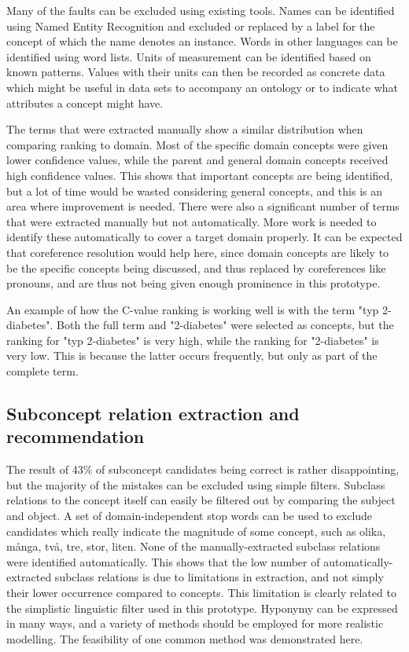 \documentclass[a4paper]{report}
\begin{document}
Many of the faults can be excluded using existing tools.
Names can be identified using Named Entity Recognition and excluded or replaced by a label for the concept of which the name denotes an instance.
Words in other languages can be identified using word lists.
Units of measurement can be identified based on known patterns.
Values with their units can then be recorded as concrete data which might be useful in data sets to accompany an ontology or to indicate what attributes a concept might have.

The terms that were extracted manually show a similar distribution when comparing ranking to domain.
Most of the specific domain concepts were given lower confidence values, while the parent and general domain concepts received high confidence values.
This shows that important concepts are being identified, but a lot of time would be wasted considering general concepts, and this is an area where improvement is needed.
There were also a significant number of terms that were extracted manually but not automatically.
More work is needed to identify these automatically to cover a target domain properly.
It can be expected that coreference resolution would help here, since domain concepts are likely to be the specific concepts being discussed, and thus replaced by coreferences like pronouns, and are thus not being given enough prominence in this prototype.

An example of how the C-value ranking is working well is with the term "typ 2-diabetes". Both the full term and "2-diabetes" were selected as concepts, but the ranking for "typ 2-diabetes" is very high, while the ranking for "2-diabetes" is very low. This is because the latter occurs frequently, but only as part of the complete term.

\subsection{Subconcept relation extraction and recommendation}

The result of 43\% of subconcept candidates being correct is rather disappointing, but the majority of the mistakes can be excluded using simple filters.
Subclass relations to the concept itself can easily be filtered out by comparing the subject and object.
A set of domain-independent stop words can be used to exclude candidates which really indicate the magnitude of some concept, such as olika, många, två, tre, stor, liten.
None of the manually-extracted subclass relations were identified automatically.
This shows that the low number of automatically-extracted subclass relations is due to limitations in extraction, and not simply their lower occurrence compared to concepts.
This limitation is clearly related to the simplistic linguistic filter used in this prototype.
Hyponymy can be expressed in many ways, and a variety of methods should be employed for more realistic modelling.
The feasibility of one common method was demonstrated here.
\end{document}
